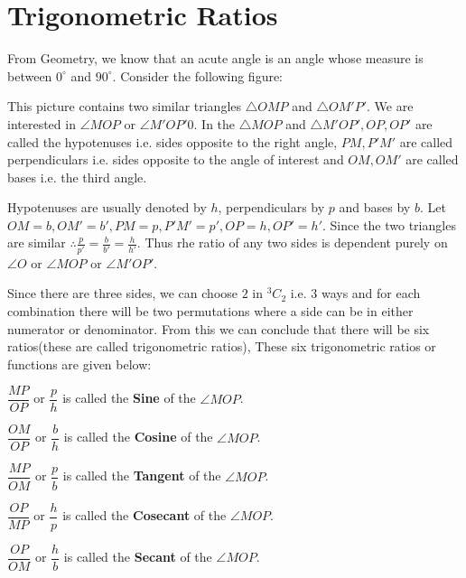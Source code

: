 \chapter{Trigonometric Ratios}
From Geometry, we know that an acute angle is an angle whose measure is between $0^\circ$ and $90^\circ$. Consider the following
figure:

This picture contains two similar triangles $\triangle OMP$ and $\triangle OM'P'$. We are interested in $\angle MOP$ or $\angle
M'OP'0$. In the $\triangle MOP$ and $\triangle M'OP', OP, OP'$ are called the hypotenuses i.e. sides opposite to the right angle,
$PM, P'M'$ are called perpendiculars i.e. sides opposite to the angle of interest and $OM, OM'$ are called bases i.e. the third
angle.

Hypotenuses are usually denoted by $h$, perpendiculars by $p$ and bases by $b$. Let $OM = b, OM' = b', PM=p, P'M' = p', OP = h, OP'
= h'$. Since the two triangles are similar $\therefore \frac{p}{p'} = \frac{b}{b'} = \frac{h}{h'}$. Thus rhe ratio of any two sides
is dependent purely on $\angle O$ or $\angle MOP$ or $\angle M'OP'$.

Since there are three sides, we can choose $2$ in ${}^3C_2$ i.e. $3$ ways and for each combination there will be two permutations
where a side can be in either numerator or denominator. From this we can conclude that there will be six ratios(these are called
trigonometric ratios), These six trigonometric ratios or functions are given below:

$\dfrac{MP}{OP}$ or $\dfrac{p}{h}$ is called the {\bf Sine} of the $\angle MOP$.

$\dfrac{OM}{OP}$ or $\dfrac{b}{h}$ is called the {\bf Cosine} of the $\angle MOP$.

$\dfrac{MP}{OM}$ or $\dfrac{p}{b}$ is called the {\bf Tangent} of the $\angle MOP$.

$\dfrac{OP}{MP}$ or $\dfrac{h}{p}$ is called the {\bf Cosecant} of the $\angle MOP$.

$\dfrac{OP}{OM}$ or $\dfrac{h}{b}$ is called the {\bf Secant} of the $\angle MOP$.

